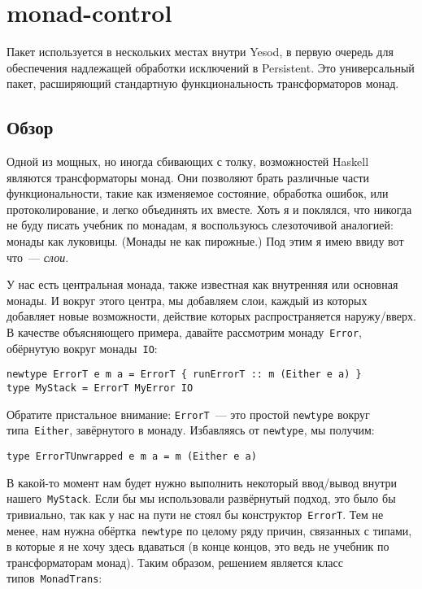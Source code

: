 \chapter{monad-control}\label{chap:monad-control}
Пакет
используется в нескольких местах внутри Yesod, в первую очередь для обеспечения
надлежащей обработки исключений в Persistent. Это универсальный пакет,
расширяющий стандартную функциональность трансформаторов монад.

\section{Обзор}
Одной из мощных, но иногда сбивающих с толку, возможностей Haskell являются
трансформаторы монад. Они позволяют брать различные части функциональности,
такие как изменяемое состояние, обработка ошибок, или протоколирование, и легко
объединять их вместе. Хоть я и поклялся, что никогда не буду писать учебник по
монадам, я воспользуюсь слезоточивой аналогией: монады как луковицы. (Монады не
как пирожные.) Под этим я имею ввиду вот что~--- \emph{слои}.

У нас есть центральная монада, также известная как внутренняя или основная
монады. И вокруг этого центра, мы добавляем слои, каждый из которых добавляет
новые возможности, действие которых распространяется наружу/вверх. В качестве
объясняющего примера, давайте рассмотрим монаду~\lstinline'Error', обёрнутую
вокруг монады~\lstinline'IO':

\begin{lstlisting}
newtype ErrorT e m a = ErrorT { runErrorT :: m (Either e a) }
type MyStack = ErrorT MyError IO
\end{lstlisting}

Обратите пристальное внимание: \lstinline'ErrorT'~--- это простой
\lstinline'newtype' вокруг типа~\lstinline'Either', завёрнутого в монаду.
Избавляясь от \lstinline'newtype', мы получим:

\begin{lstlisting}
type ErrorTUnwrapped e m a = m (Either e a)
\end{lstlisting}

В какой-то момент нам будет нужно выполнить некоторый ввод/вывод внутри
нашего~\lstinline'MyStack'.  Если бы мы использовали развёрнутый подход, это
было бы тривиально, так как у нас на пути не стоял бы
конструктор~\lstinline'ErrorT'. Тем не менее, нам нужна
обёртка~\lstinline'newtype' по целому ряду причин, связанных с типами, в
которые я не хочу здесь вдаваться (в конце концов, это ведь не учебник по
трансформаторам монад). Таким образом, решением является класс
типов~\lstinline'MonadTrans':


